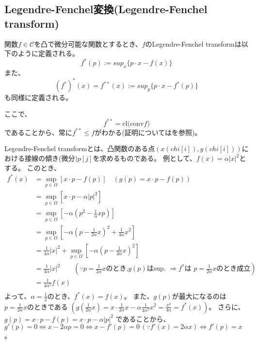 
\subsection{Legendre-Fenchel変換(Legendre-Fenchel transform)}
\label{sect:Legendre-Fenchel変換(Legendre-Fenchel transform)}
\begin{dfn}
    関数$f \in \mathcal{C}$を凸で微分可能な関数とするとき、$f$のLegendre-Fenchel transformは以下のように定義される。
    \begin{equation}
        f^*(p) := sup_x\{p \cdot x - f(x) \} 
    \end{equation}
    また、
    \begin{equation}
        (f^*)^*(x) = f^{**} (x) := sup_p\{p \cdot x - f^*(p) \}
    \end{equation}
    も同様に定義される。
\end{dfn}
ここで、
\[
    f^{**} = \text{cl(conv} f)  
\]
であることから、常に$f^{**} \le f$がわかる(証明については\cite[Thm. 11.1(p474)]{MR1491362}を参照)。

Legendre-Fenchel transformとは、凸関数のある点$(x(chi[i]), y(chi[i]))$における接線の傾き(微分)$p[j]$を求めるものである。
例として、$f(x) = \alpha |x|^2$とする。
このとき、
\begin{align*}
f^*(x) &= \displaystyle \sup_{p\in \Omega}{[x \cdot p - f(p)]} \quad (g(p) = x \cdot p - f(p))\\
           &=\displaystyle \sup_{p\in \Omega}{[x \cdot p - \alpha |p|^2]}\\
           &= \displaystyle \sup_{p\in \Omega}{[- \alpha(p^2 - \frac{1}{\alpha}xp)]}\\
           &= \displaystyle \sup_{p\in \Omega}{[- \alpha(p - \frac{1}{2 \alpha}x)^2 +  \frac{1}{4 \alpha}x^2]}\\
           &=  \frac{1}{4 \alpha}|x|^2 + \sup_{p\in \Omega}{[- \alpha(p - \frac{1}{2 \alpha}x)^2]}\\
           &= \frac{1}{4 \alpha}|x|^2 \qquad (\because  \text{$p = \frac{1}{2 \alpha}x$のとき,$g(p)$はsup.  $\Rightarrow f^*$は $p = \frac{1}{2 \alpha}x$のとき成立})\\
           &= \frac{1}{4 \alpha^2}f(x)\\
\end{align*}
よって、$\alpha = \frac{1}{2}$のとき、$f^*(x) = f(x)。$
また、$g(p)$が最大になるのは$p = \frac{1}{2 \alpha}x$のときである
$(g( \frac{1}{2 \alpha}x) = x \cdot \frac{1}{2 \alpha}x - \alpha  \frac{1}{4 \alpha^2}x^2 =  \frac{x^2}{4 \alpha} = f^*(x))$。
さらに、
$g(p) = x \cdot p - f(p)= x \cdot p - \alpha |p|^2$
であることから、
$g'(p) = 0 \Leftrightarrow x - 2 \alpha p = 0 \Leftrightarrow x - f'(p) = 0 \, (\because f'(x) = 2 \alpha x) \Leftrightarrow f'(p) = x$ 。

